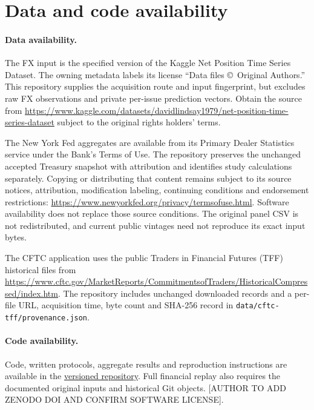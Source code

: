 \section*{Data and code availability}
\paragraph{Data availability.} The FX input is the specified version of the Kaggle Net Position Time Series Dataset. The owning metadata labels its license ``Data files \copyright\ Original Authors.'' This repository supplies the acquisition route and input fingerprint, but excludes raw FX observations and private per-issue prediction vectors. Obtain the source from \url{https://www.kaggle.com/datasets/davidlindsay1979/net-position-time-series-dataset} subject to the original rights holders' terms.

The New York Fed aggregates are available from its Primary Dealer Statistics service under the Bank's Terms of Use. The repository preserves the unchanged accepted Treasury snapshot with attribution and identifies study calculations separately. Copying or distributing that content remains subject to its source notices, attribution, modification labeling, continuing conditions and endorsement restrictions: \url{https://www.newyorkfed.org/privacy/termsofuse.html}. Software availability does not replace those source conditions. The original panel CSV is not redistributed, and current public vintages need not reproduce its exact input bytes.

The CFTC application uses the public Traders in Financial Futures (TFF) historical files from \url{https://www.cftc.gov/MarketReports/CommitmentsofTraders/HistoricalCompressed/index.htm}. The repository includes unchanged downloaded records and a per-file URL, acquisition time, byte count and SHA-256 record in \texttt{data/cftc-tff/provenance.json}.

\paragraph{Code availability.} Code, written protocols, aggregate results and reproduction instructions are available in the \href{https://github.com/ByronLi0207/financial-mathematics-paper-20261020/tree/submission-final}{versioned repository}. Full financial replay also requires the documented original inputs and historical Git objects. [AUTHOR TO ADD ZENODO DOI AND CONFIRM SOFTWARE LICENSE].

